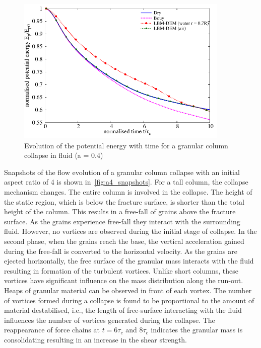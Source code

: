\begin{figure}
	\centering
    \includegraphics[width=0.9\textwidth]{PE_a04f}
    \caption{Evolution of the potential energy with time for a granular column 
    collapse in fluid (a = 0.4)}
    \label{fig:PE_a04f}
\end{figure}


Snapshots of the flow evolution of a granular column collapse with an initial 
aspect ratio of 4 is shown in~\cref{fig:a4_snapshots}. For a tall column, the 
collapse mechanism changes. The entire column is involved in the collapse. The 
height of the static region, which is below the fracture surface, is shorter 
than the total height of the column. This results in a free-fall of grains 
above the fracture surface. As the grains experience free-fall they interact 
with the surrounding fluid. However, no vortices are observed during the 
initial stage of collapse. In the second phase, when the grains reach the base, 
the vertical acceleration gained during the free-fall is converted to the 
horizontal velocity. As the grains are ejected horizontally, the free 
surface of the granular mass interacts with the fluid resulting in formation of 
the turbulent vortices. Unlike short columns, these vortices have significant 
influence on the mass distribution along the run-out. Heaps of granular 
material can be observed in front of each vortex. The number of vortices 
formed during a collapse is found to be proportional to the amount of material 
destabilised, i.e., the length of free-surface interacting with the fluid 
influences the number of vortices generated during the collapse. The 
reappearance of force chains at $t = 6\tau_c$ and $8\tau_c$ indicates the 
granular mass is consolidating resulting in an increase in the shear strength. 

